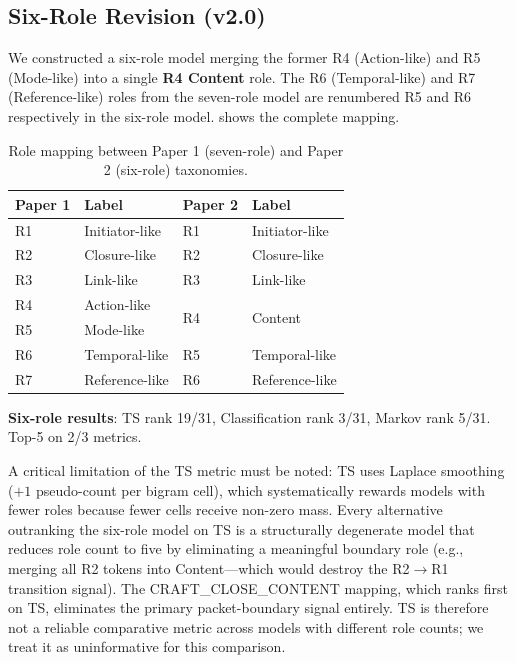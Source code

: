\documentclass[11pt,a4paper,twocolumn]{article}
\begin{document}
\subsection{Six-Role Revision (v2.0)}

We constructed a six-role model merging the former R4 (Action-like) and R5 (Mode-like) into a single \textbf{R4 Content} role. The R6 (Temporal-like) and R7 (Reference-like) roles from the seven-role model are renumbered R5 and R6 respectively in the six-role model.  shows the complete mapping.

\begin{table}[H]
\centering
\caption{Role mapping between Paper 1 (seven-role) and Paper 2 (six-role) taxonomies.}
\label{tab:rolemap}
\small
\begin{tabular}{@{}llll@{}}
\toprule
\textbf{Paper 1} & \textbf{Label} & \textbf{Paper 2} & \textbf{Label} \\
\midrule
R1 & Initiator-like & R1 & Initiator-like \\
R2 & Closure-like & R2 & Closure-like \\
R3 & Link-like & R3 & Link-like \\
R4 & Action-like & \multirow{2}{*}{R4} & \multirow{2}{*}{Content} \\
R5 & Mode-like & & \\
R6 & Temporal-like & R5 & Temporal-like \\
R7 & Reference-like & R6 & Reference-like \\
\bottomrule
\end{tabular}
\end{table}

\noindent\textbf{Six-role results}: TS rank 19/31, Classification rank 3/31, Markov rank 5/31. Top-5 on 2/3 metrics.

A critical limitation of the TS metric must be noted: TS uses Laplace smoothing ($+1$ pseudo-count per bigram cell), which systematically rewards models with fewer roles because fewer cells receive non-zero mass. Every alternative outranking the six-role model on TS is a structurally degenerate model that reduces role count to five by eliminating a meaningful boundary role (e.g., merging all R2 tokens into Content---which would destroy the R2$\to$R1 transition signal). The CRAFT\_CLOSE\_CONTENT mapping, which ranks first on TS, eliminates the primary packet-boundary signal entirely. TS is therefore not a reliable comparative metric across models with different role counts; we treat it as uninformative for this comparison.
\end{document}
